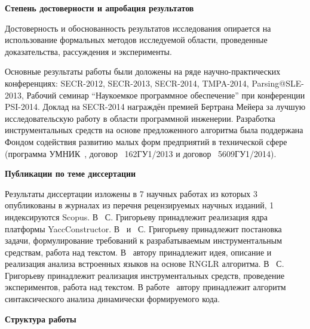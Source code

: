 \textbf{Степень достоверности и апробация результатов}

Достоверность и обоснованность результатов исследования опирается на использование формальных методов исследуемой области, проведенные доказательства, рассуждения и эксперименты.

Основные результаты работы были доложены на ряде научно-практических конференциях: SECR-2012, SECR-2013, SECR-2014, TMPA-2014, Parsing@SLE-2013, Рабочий семинар ``Наукоемкое программное обеспечение'' при конференции PSI-2014. Доклад на SECR-2014 награждён премией Бертрана Мейера за лучшую исследовательскую работу в области программной инженерии. Разработка инструментальных средств на основе предложенного алгоритма была поддержана Фондом содействия развитию малых форм предприятий в технической сфере (программа УМНИК~\cite{UMNIC}, договор \textnumero~162ГУ1/2013 и договор \textnumero~5609ГУ1/2014).

\textbf{Публикации по теме диссертации}

Результаты диссертации изложены в 7 научных работах из которых 3~\cite{YCArticle,SELforIDEru,AbstractGLL} опубликованы в журналах из перечня рецензируемых научных изданий, 
1~\cite{GLRAbsPars} индексируются Scopus. В~\cite{Syrcose} С. Григорьеву принадлежит реализация ядра платформы YaccConstructor. В~\cite{SELforIDEru, AbstractGLL} и~\cite{SELforIDE} С. Григорьеву принадлежит постановка задачи, формулирование требований к разрабатываемым инструментальным средствам, работа над текстом. 
В~\cite{GLRAbsPars} автору принадлежит идея, описание и реализация анализа встроенных языков на основе RNGLR алгоритма.  В~\cite{YCArticle} С. Григорьеву принадлежит реализация инструментальных средств, проведение экспериментов, работа над текстом. В работе~\cite{RelaxedARNGLR} автору принадлежит алгоритм синтаксического анализа динамически формируемого кода.


\textbf{Структура работы}

